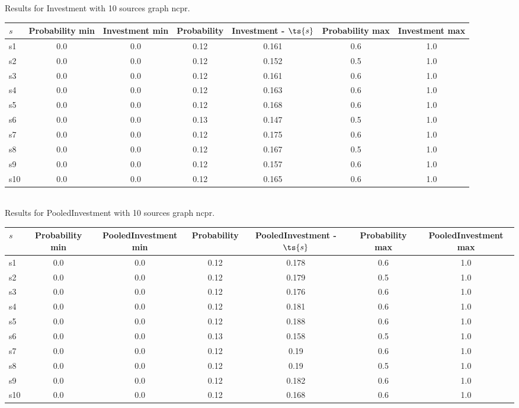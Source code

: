 \documentclass{article}
\begin{document}
\noindent Results for Investment with 10 sources graph ncpr.

\noindent\begin{tabular}{|l|c|c|c|c|c|c|}
\hline
$s$& Probability min & Investment min & Probability & Investment - $\ts{s}$ & Probability max & Investment max\\
\hline
s1 &0.0 & 0.0 & 0.12 & 0.161 & 0.6 & 1.0\\
\hline
s2 &0.0 & 0.0 & 0.12 & 0.152 & 0.5 & 1.0\\
\hline
s3 &0.0 & 0.0 & 0.12 & 0.161 & 0.6 & 1.0\\
\hline
s4 &0.0 & 0.0 & 0.12 & 0.163 & 0.6 & 1.0\\
\hline
s5 &0.0 & 0.0 & 0.12 & 0.168 & 0.6 & 1.0\\
\hline
s6 &0.0 & 0.0 & 0.13 & 0.147 & 0.5 & 1.0\\
\hline
s7 &0.0 & 0.0 & 0.12 & 0.175 & 0.6 & 1.0\\
\hline
s8 &0.0 & 0.0 & 0.12 & 0.167 & 0.5 & 1.0\\
\hline
s9 &0.0 & 0.0 & 0.12 & 0.157 & 0.6 & 1.0\\
\hline
s10 &0.0 & 0.0 & 0.12 & 0.165 & 0.6 & 1.0\\
\hline
\end{tabular}\\

\noindent Results for PooledInvestment with 10 sources graph ncpr.

\noindent\begin{tabular}{|l|c|c|c|c|c|c|}
\hline
$s$& Probability min & PooledInvestment min & Probability & PooledInvestment - $\ts{s}$ & Probability max & PooledInvestment max\\
\hline
s1 &0.0 & 0.0 & 0.12 & 0.178 & 0.6 & 1.0\\
\hline
s2 &0.0 & 0.0 & 0.12 & 0.179 & 0.5 & 1.0\\
\hline
s3 &0.0 & 0.0 & 0.12 & 0.176 & 0.6 & 1.0\\
\hline
s4 &0.0 & 0.0 & 0.12 & 0.181 & 0.6 & 1.0\\
\hline
s5 &0.0 & 0.0 & 0.12 & 0.188 & 0.6 & 1.0\\
\hline
s6 &0.0 & 0.0 & 0.13 & 0.158 & 0.5 & 1.0\\
\hline
s7 &0.0 & 0.0 & 0.12 & 0.19 & 0.6 & 1.0\\
\hline
s8 &0.0 & 0.0 & 0.12 & 0.19 & 0.5 & 1.0\\
\hline
s9 &0.0 & 0.0 & 0.12 & 0.182 & 0.6 & 1.0\\
\hline
s10 &0.0 & 0.0 & 0.12 & 0.168 & 0.6 & 1.0\\
\hline
\end{tabular}\\
\end{document}

